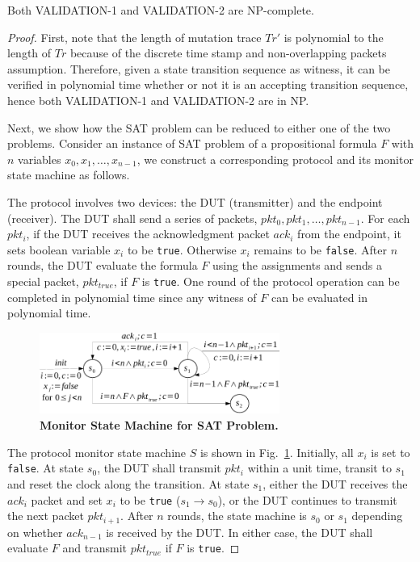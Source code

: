 \begin{lemma}
  \label{lem:sub}
  Both VALIDATION-1 and VALIDATION-2 are NP-complete.
\end{lemma}
\begin{proof}
  First, note that the length of mutation trace $Tr'$ is polynomial to the
  length of $Tr$ because of the discrete time stamp and non-overlapping packets
  assumption.
  Therefore, given a state transition sequence as witness, it can be verified in
  polynomial time whether or not it is an accepting transition sequence, hence
  both VALIDATION-1 and VALIDATION-2 are in NP.

  Next, we show how the SAT problem can be reduced to either one of the two
  problems.
  Consider an instance of SAT problem of a propositional formula $F$ with $n$
  variables $x_0,x_1,\ldots, x_{n-1}$, we construct a corresponding protocol and
  its monitor state machine as follows.

  The protocol involves two devices: the DUT (transmitter) and the endpoint
  (receiver).
  The DUT shall send a series of packets, $pkt_0, pkt_1,\ldots, pkt_{n-1}$.
  For each $pkt_i$, if the DUT receives the
  acknowledgment packet $ack_i$ from the endpoint, it sets boolean variable
  $x_i$ to be \texttt{true}.
  Otherwise $x_i$ remains to be \texttt{false}.
  After $n$ rounds, the DUT evaluate the formula $F$ using the assignments and
  sends a special packet, $pkt_{true}$, if $F$ is \texttt{true}.
  One round of the protocol operation can be completed in polynomial time since
  any witness of $F$ can be evaluated in polynomial time.

  \begin{figure}[h!]
    \centering
    \includegraphics[width=0.7\textwidth]{./figures/sat_sm.pdf}
    \caption{\textbf{Monitor State Machine for SAT Problem.}}
    \label{fig:sat}
  \end{figure}



  The protocol monitor state machine $S$ is shown in Fig.~\ref{fig:sat}.
  Initially, all $x_i$ is set to \texttt{false}.
  At state $s_0$, the DUT shall transmit $pkt_i$ within a unit time, transit to
  $s_1$ and reset the clock along the transition.
  At state $s_1$, either the DUT receives the $ack_i$ packet and
  set $x_i$ to be \texttt{true} ($s_1 \rightarrow s_0$), or the DUT continues to
  transmit the next packet $pkt_{i+1}$.
  After $n$ rounds, the state machine is $s_0$ or $s_1$ depending on whether
  $ack_{n-1}$ is received by the DUT.
  In either case, the DUT shall evaluate $F$ and transmit $pkt_{true}$ if $F$ is
  \texttt{true}.  


\end{proof}
